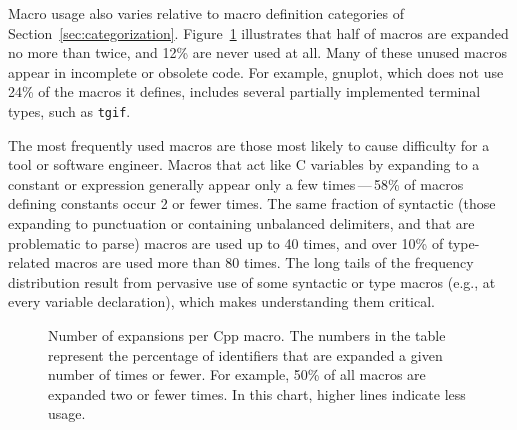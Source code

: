 \documentclass[10pt]{article}
\newcommand{\pkg}[1]{\textsf{#1}}
\newcommand{\captionsmall}[1]{\caption[]{\small #1}}
\begin{document}
Macro usage also varies relative to macro definition categories of
Section~\ref{sec:categorization}.  Figure~\ref{fig:freq-use-cat}
illustrates that half of macros are expanded no more than twice, and 12\% are
never used at all.  Many of these unused macros appear in incomplete or
obsolete code.  For example, \pkg{gnuplot}, which does not use 24\% of the
macros it defines, includes several partially implemented terminal types,
such as {\tt tgif}.

The most frequently used macros are those most likely to cause difficulty
for a tool or software engineer.  Macros that act like C variables by
expanding to a constant or expression generally appear only a few
times\,---\,58\% of macros defining constants occur 2 or fewer times.
The same fraction of syntactic (those expanding to punctuation or
containing unbalanced delimiters, and that are problematic to parse)
macros are used up to 40 times, and over 10\% of type-related macros are
used more than 80 times.  The long tails of the frequency distribution
result from pervasive use of some syntactic or type macros (e.g., at every
variable declaration), which makes understanding them critical.


\begin{figure}
\centerline{}
\captionsmall{Number of expansions per Cpp macro.  The numbers in the
  table represent the percentage of identifiers that are expanded a given
  number of times or fewer.  For example, 50\% of all macros are expanded
  two or fewer times.  In this chart, higher lines indicate less usage.}
\label{fig:freq-use-cat}
\end{figure}

\end{document}

